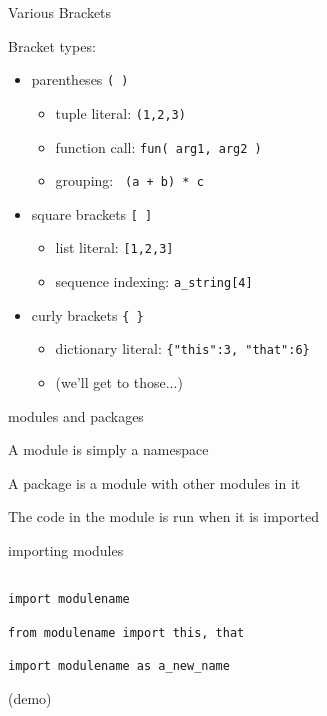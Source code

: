 \documentclass{beamer}
\begin{document}
\begin{frame}[fragile]{Various Brackets}

{\Large Bracket types:}

\begin{itemize}
  \item parentheses \verb+( )+
    \begin{itemize}
      \item tuple literal: \verb+(1,2,3)+
      \item function call: \verb+fun( arg1, arg2 )+
      \item grouping: \verb| (a + b) * c |
    \end{itemize}
  \item square brackets \verb+[ ]+
    \begin{itemize}
      \item list literal: \verb+[1,2,3]+
      \item sequence indexing: \verb+a_string[4]+
    \end{itemize}
  \item curly brackets \verb+{ }+
    \begin{itemize}
      \item dictionary literal: \verb+{"this":3, "that":6}+
      \item (we'll get to those...)
    \end{itemize}
\end{itemize}

\end{frame}


\begin{frame}{modules and packages}

{\Large A module is simply a namespace}

\vfill
{\Large A package is a module with other modules in it}

\vfill
{\Large The code in the module is run when it is imported}

\end{frame}

\begin{frame}[fragile]{importing modules}

\begin{verbatim}

import modulename

from modulename import this, that

import modulename as a_new_name
\end{verbatim}

\vfill
(demo)

\end{frame} 
\end{document}
